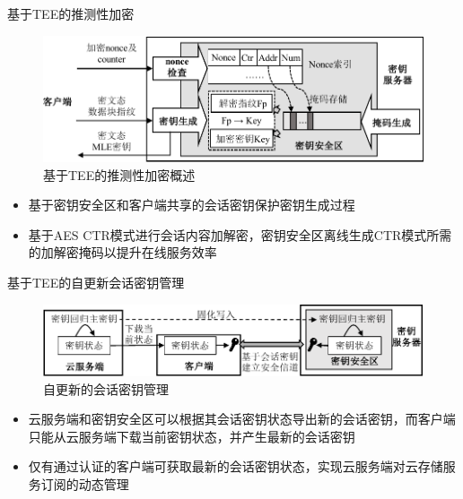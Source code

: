 \documentclass{beamer}
\begin{document}
\begin{frame}{基于TEE的推测性加密}
    \begin{figure}[!htb]
        \centering
        \includegraphics[width=\textwidth]{../pic/sgxdedup/key-enclave-arch.pdf}
        \caption{基于TEE的推测性加密概述}
        \label{fig:sgxdedup-SpecEnc}
    \end{figure}
    \vspace{-1em}
    \begin{itemize}
        \item  基于密钥安全区和客户端共享的会话密钥保护密钥生成过程
        \item 基于AES CTR模式进行会话内容加解密，密钥安全区离线生成CTR模式所需的加解密掩码以提升在线服务效率
    \end{itemize}
\end{frame}

\begin{frame}{基于TEE的自更新会话密钥管理}
    \begin{figure}[!htb]
        \centering
        \includegraphics[width=\textwidth]{../pic/sgxdedup/keyRegression.pdf}
        \caption{自更新的会话密钥管理}
        \label{fig:sgxdedup-keymanage}
    \end{figure}
    \vspace{-1em}
    \begin{itemize}
        \item 云服务端和密钥安全区可以根据其会话密钥状态导出新的会话密钥，而客户端只能从云服务端下载当前密钥状态，并产生最新的会话密钥
        \item 仅有通过认证的客户端可获取最新的会话密钥状态，实现云服务端对云存储服务订阅的动态管理
    \end{itemize}
\end{frame}
\end{document}
